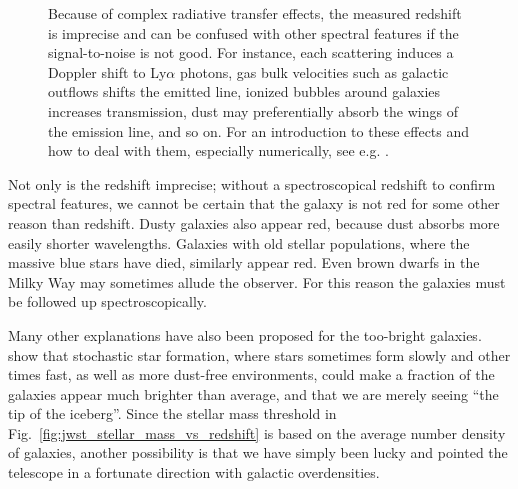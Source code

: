 \documentclass[useAMS]{aa}
\begin{document}
\begin{figure}[!t]
\begin{bclogo}[
    couleur=gray!20,
    epBord=1,
    arrondi=0.1,
    logo=\bcinfo,
    marge=8,
    ombre=false, %
    couleurBord=gray!60,
    barre=line]
{{    Because of complex radiative transfer effects, the measured redshift is imprecise and can be confused with other spectral features if the signal-to-noise is not good.
    For instance, each scattering induces a Doppler shift to Ly$\alpha$ photons, gas bulk velocities such as galactic outflows shifts the emitted line, ionized bubbles around galaxies increases transmission, dust may preferentially absorb the wings of the emission line, and so on.
    For an introduction to these effects and how to deal with them, especially numerically, see e.g. \citet{Laursen2010}.
    }}
\label{info:lyabreak}
\end{bclogo}
     \endminipage
\end{figure}

Not only is the redshift imprecise; without a spectroscopical redshift to confirm spectral features, we cannot be certain that the galaxy is not red for some other reason than redshift. Dusty galaxies also appear red, because dust absorbs more easily shorter wavelengths. Galaxies with old stellar populations, where the massive blue stars have died, similarly appear red. Even brown dwarfs in the Milky Way may sometimes allude the observer.
For this reason the galaxies must be followed up spectroscopically.

Many other explanations have also been proposed for the too-bright galaxies.
\citet{Mason2023} show that stochastic star formation, where stars sometimes form slowly and other times fast, as well as more dust-free environments, could make a fraction of the galaxies appear much brighter than average, and that we are merely seeing ``the tip of the iceberg''.
Since the stellar mass threshold in Fig.~\ref{fig:jwst_stellar_mass_vs_redshift} is based on the average number density of galaxies, another possibility is that we have simply been lucky and pointed the telescope in a fortunate direction with galactic overdensities.
\end{document}
